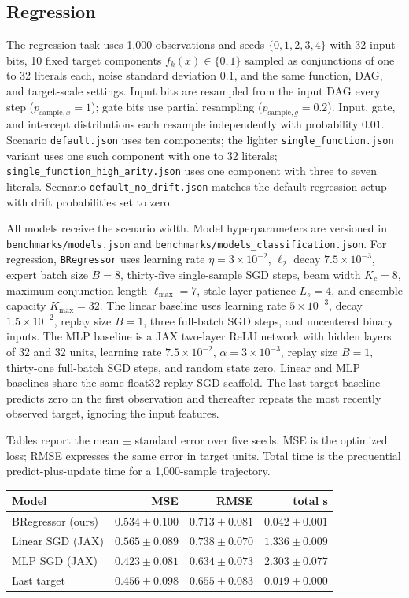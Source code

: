 \documentclass[11pt]{article}
\begin{document}
\subsection{Regression}
The regression task uses 1,000 observations and seeds
$\{0,1,2,3,4\}$ with 32 input bits,
10 fixed target components $f_k(x)\in\{0,1\}$ sampled as conjunctions of one to 32
literals each, noise standard deviation $0.1$, and the same
function, DAG, and target-scale settings.  Input bits are resampled from the
input DAG every step ($p_{\mathrm{sample},x}=1$); gate bits use partial
resampling ($p_{\mathrm{sample},g}=0.2$).  Input, gate, and intercept
distributions each resample independently with probability $0.01$.
Scenario \texttt{default.json} uses ten components; the lighter
\texttt{single\_function.json} variant uses one such component with one to 32
literals; \texttt{single\_function\_high\_arity.json} uses one component with
three to seven literals.  Scenario
\texttt{default\_no\_drift.json} matches the default regression setup with
drift probabilities set to zero.

All models receive the scenario width.  Model hyperparameters are versioned in
\texttt{benchmarks/models.json} and \texttt{benchmarks/models\_classification.json}.
For regression, \texttt{BRegressor} uses learning rate $\eta=3\times10^{-2}$,
$\ell_2$ decay $7.5\times10^{-3}$, expert batch size $B=8$, thirty-five
single-sample SGD steps, beam width $K_c=8$, maximum conjunction length
$\ell_{\max}=7$, stale-layer patience $L_s=4$, and ensemble capacity
$K_{\max}=32$.
The linear baseline uses learning rate $5\times10^{-3}$, decay $1.5\times10^{-2}$,
replay size $B=1$, three full-batch SGD steps, and uncentered binary inputs.
The MLP baseline is a JAX two-layer ReLU network with hidden layers of 32 and 32 units,
learning rate $7.5\times10^{-2}$, $\alpha=3\times10^{-3}$, replay size $B=1$,
thirty-one full-batch SGD steps, and random state zero.
Linear and MLP baselines share the same float32 replay SGD scaffold.  The last-target
baseline predicts zero on the first observation and thereafter repeats the most
recently observed target, ignoring the input features.

Tables report the mean $\pm$ standard error over five seeds.  MSE is the
optimized loss; RMSE expresses the same error in target units.  Total time is
the prequential predict-plus-update time for a 1,000-sample trajectory.

\begin{center}
\footnotesize
\begin{tabular}{lrrr}
\hline
\textbf{Model} & MSE & RMSE & total s \\
\hline
BRegressor (ours) & $0.534\pm0.100$ & $0.713\pm0.081$ & $0.042\pm0.001$ \\
Linear SGD (JAX) & $0.565\pm0.089$ & $0.738\pm0.070$ & $1.336\pm0.009$ \\
MLP SGD (JAX) & $0.423\pm0.081$ & $0.634\pm0.073$ & $2.303\pm0.077$ \\
Last target & $0.456\pm0.098$ & $0.655\pm0.083$ & $0.019\pm0.000$ \\
\hline
\end{tabular}
\end{center}
\end{document}
